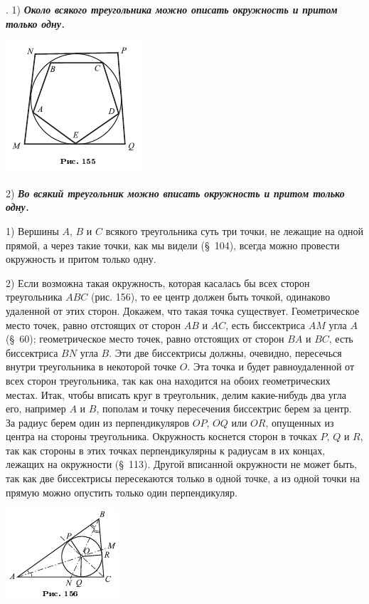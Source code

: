 \documentclass[oneside]{book}
\begin{document}
.
1) \textbf{\emph{Около всякого треугольника можно описать окружность и притом только одну.}}

\includegraphics{pics/ris-155}

2) \textbf{\emph{Во всякий треугольник можно вписать окружность и притом только одну.}}

1) Вершины $A$, $B$ и $C$ всякого треугольника суть три точки, не лежащие на одной прямой, а через такие точки, как мы видели (§~104), всегда можно провести окружность и притом только одну.

2) Если возможна такая окружность, которая касалась бы всех сторон треугольника $ABC$ (рис. 156),
то ее центр должен быть точкой, одинаково удаленной от этих сторон.
Докажем, что такая точка существует.
Геометрическое место точек, равно отстоящих от сторон $AB$ и $AC$, есть биссектриса $AM$ угла $A$ (§~60);
геометрическое место точек, равно отстоящих от сторон $BA$ и $BC$, есть биссектриса $BN$ угла $B$.
Эти две биссектрисы должны, очевидно, пересечься внутри треугольника в некоторой точке $O$.
Эта точка и будет равноудаленной от всех сторон треугольника, так как она находится на обоих геометрических местах.
Итак, чтобы вписать круг в треугольник, делим какие-нибудь два угла его, например $A$ и $B$, пополам и точку пересечения биссектрис берем за центр.
За радиус берем один из перпендикуляров $OP$, $OQ$ или $OR$, опущенных из центра на стороны треугольника.
Окружность коснется сторон в точках $P$, $Q$ и $R$, так как стороны в этих точках перпендикулярны к радиусам в их концах, лежащих на окружности (§~113).
Другой вписанной окружности не может быть, так как две биссектрисы пересекаются только в одной точке, а из одной точки на прямую можно опустить только один перпендикуляр.

\includegraphics{pics/ris-156}
\end{document}
